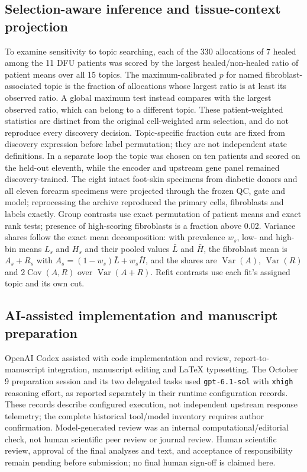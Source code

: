 \subsection{Selection-aware inference and tissue-context projection}
To examine sensitivity to topic searching, each of the 330 allocations of 7 healed among the 11 DFU patients was scored by the largest healed/non-healed ratio of patient means over all 15 topics. The maximum-calibrated $p$ for named fibroblast-associated topic is the fraction of allocations whose largest ratio is at least its observed ratio. A global maximum test instead compares with the largest observed ratio, which can belong to a different topic. These patient-weighted statistics are distinct from the original cell-weighted arm selection, and do not reproduce every discovery decision. Topic-specific fraction cuts are fixed from discovery expression before label permutation; they are not independent state definitions. In a separate loop the topic was chosen on ten patients and scored on the held-out eleventh, while the encoder and upstream gene panel remained discovery-trained. The eight intact foot-skin specimens from diabetic donors and all eleven forearm specimens were projected through the frozen QC, gate and model; reprocessing the archive reproduced the primary cells, fibroblasts and labels exactly. Group contrasts use exact permutation of patient means and exact rank tests; presence of high-scoring fibroblasts is a fraction above 0.02. Variance shares follow the exact mean decomposition: with prevalence $w_s$, low- and high-bin means $L_s$ and $H_s$ and their pooled values $\bar L$ and $\bar H$, the fibroblast mean is $A_s+R_s$ with $A_s=(1-w_s)\bar L+w_s\bar H$, and the shares are $\operatorname{Var}(A)$, $\operatorname{Var}(R)$ and $2\operatorname{Cov}(A,R)$ over $\operatorname{Var}(A+R)$. Refit contrasts use each fit's assigned topic and its own cut.

\subsection{AI-assisted implementation and manuscript preparation}
OpenAI Codex assisted with code implementation and review, report-to-manuscript integration, manuscript editing and LaTeX typesetting. The October 9 preparation session and its two delegated tasks used \texttt{gpt-6.1-sol} with \texttt{xhigh} reasoning effort, as reported separately in their runtime configuration records. These records describe configured execution, not independent upstream response telemetry; the complete historical tool/model inventory requires author confirmation. Model-generated review was an internal computational/editorial check, not human scientific peer review or journal review. Human scientific review, approval of the final analyses and text, and acceptance of responsibility remain pending before submission; no final human sign-off is claimed here.
